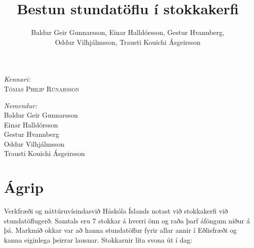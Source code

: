 \documentclass[a4paper,12pt]{article}
\begin{document}
\begin{titlepage}
\begin{center}
\begin{minipage}{0.4\textwidth}
\begin{flushleft} 
\vspace{1cm}
\emph{Kennari:}\\
\textsc{Tómas Philip Rúnarsson}\\
\end{flushleft}
\end{minipage}
\begin{minipage}{0.4\textwidth}
\begin{flushright} 
\emph{Nemendur:}\\
Baldur Geir Gunnarsson\\
Einar Halldórsson\\
Gestur Hvannberg\\
Oddur Vilhjálmsson\\
Trausti Kouichi Ásgeirsson
\end{flushright}
\end{minipage}

\end{center}

\newpage
\thispagestyle{empty} \mbox{}
\vfill
\vfill 
\thispagestyle{empty}
\cleardoublepage



\end{titlepage}

\title{Bestun stundatöflu í stokkakerfi}
\author{Baldur Geir Gunnarsson, Einar Halldórsson, Gestur Hvannberg,\\ Oddur Vilhjálmsson, Trausti Kouichi Ásgeirsson}
\maketitle

\section{Ágrip}
Verkfræði og náttúruvísindasvið Háskóla Íslands notast við stokkakerfi við stundatöflugerð. Samtals eru 7 stokkar á hverri önn og raða þarf áföngum niður á þá. Markmið okkar var að hanna stundatöflur fyrir allar annir í Eðlisfræði og kanna eiginlega þeirrar lausnar. Stokkarnir líta svona út í dag:
\end{document}
